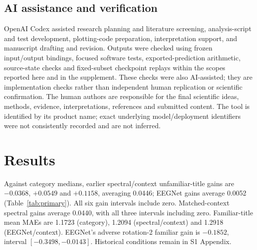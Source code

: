 \documentclass[10pt,letterpaper]{article}
\begin{document}
\subsection{AI assistance and verification}
OpenAI Codex assisted research planning and literature screening, analysis-script and test development, plotting-code preparation, interpretation support, and manuscript drafting and revision. Outputs were checked using frozen input/output bindings, focused software tests, exported-prediction arithmetic, source-state checks and fixed-subset checkpoint replays within the scopes reported here and in the supplement. These checks were also AI-assisted; they are implementation checks rather than independent human replication or scientific confirmation. The human authors are responsible for the final scientific ideas, methods, evidence, interpretations, references and submitted content. The tool is identified by its product name; exact underlying model/deployment identifiers were not consistently recorded and are not inferred.

\section{Results}


Against category medians, earlier spectral/context unfamiliar-title gains are \(-0.0368\), \(+0.0549\) and \(+0.1158\), averaging 0.0446; EEGNet gains average 0.0052 (Table~\ref{tab:primary}). All six gain intervals include zero. Matched-context spectral gains average 0.0440, with all three intervals including zero. Familiar-title mean MAEs are 1.1723 (category), 1.2094 (spectral/context) and 1.2918 (EEGNet/context). EEGNet's adverse rotation-2 familiar gain is \(-0.1852\), interval \([-0.3498,-0.0143]\). Historical conditions remain in S1 Appendix.
\end{document}
